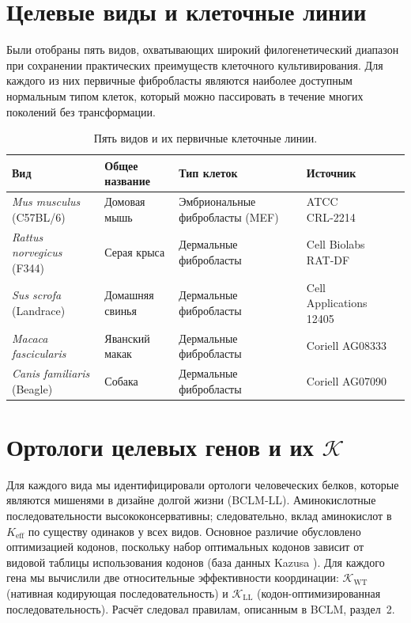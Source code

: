 \documentclass[12pt,a4paper]{article}
\newcommand{\REL}{\mathcal{K}}          %
\begin{document}
	\section{Целевые виды и клеточные линии}
	\label{sec:species}
	Были отобраны пять видов, охватывающих широкий филогенетический диапазон при сохранении практических преимуществ клеточного культивирования. Для каждого из них первичные фибробласты являются наиболее доступным нормальным типом клеток, который можно пассировать в течение многих поколений без трансформации.
	
	\begin{table}[H]
		\centering
		\caption{Пять видов и их первичные клеточные линии.}
		\label{tab:species}
		\begin{tabular}{@{}lllll@{}}
			\toprule
			\textbf{Вид} & \textbf{Общее название} & \textbf{Тип клеток} & \textbf{Источник} \\
			\midrule
			\textit{Mus musculus} (C57BL/6) & Домовая мышь & Эмбриональные фибробласты (MEF) & ATCC CRL‑2214 \\
			\textit{Rattus norvegicus} (F344) & Серая крыса & Дермальные фибробласты & Cell Biolabs RAT‑DF \\
			\textit{Sus scrofa} (Landrace) & Домашняя свинья & Дермальные фибробласты & Cell Applications 12405 \\
			\textit{Macaca fascicularis} & Яванский макак & Дермальные фибробласты & Coriell AG08333 \\
			\textit{Canis familiaris} (Beagle) & Собака & Дермальные фибробласты & Coriell AG07090 \\
			\bottomrule
		\end{tabular}
	\end{table}
	
	\section{Ортологи целевых генов и их \(\REL\)}
	\label{sec:genes}
	Для каждого вида мы идентифицировали ортологи человеческих белков, которые являются мишенями в дизайне долгой жизни (BCLM‑LL). Аминокислотные последовательности высококонсервативны; следовательно, вклад аминокислот в \(K_{\mathrm{eff}}\) по существу одинаков у всех видов. Основное различие обусловлено оптимизацией кодонов, поскольку набор оптимальных кодонов зависит от видовой таблицы использования кодонов (база данных Kazusa \cite{codon_usage_db}). Для каждого гена мы вычислили две относительные эффективности координации: \(\REL_{\mathrm{WT}}\) (нативная кодирующая последовательность) и \(\REL_{\mathrm{LL}}\) (кодон-оптимизированная последовательность). Расчёт следовал правилам, описанным в BCLM, раздел~2.
	
\end{document}
